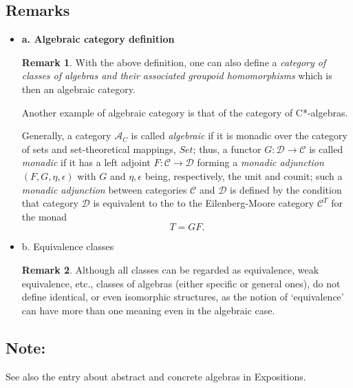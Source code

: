 \documentclass[12pt]{article}
\theoremstyle{plain}
\theoremstyle{definition}
\newtheorem{remark}{Remark}[section]
\numberwithin{equation}{section}
\begin{document}
\subsection{Remarks}
\begin{itemize}
\item {\bf a. Algebraic category definition}

\begin{remark}
 With the above definition, one can also define a \emph{category of classes of algebras and their
associated groupoid homomorphisms} which is then an algebraic category. 
 
 Another example of algebraic category is that of the category of C*-algebras.

 Generally, a category $\mathcal{A}_C$ is called \emph{algebraic} if it is monadic over the category of sets and set-theoretical mappings, $Set$; thus, a functor $G: \mathcal{D} \to \mathcal{C}$ is called \emph{monadic} if it has a left adjoint 
$F: \mathcal{C}\to \mathcal{D}$ forming a {\em monadic adjunction} $(F,G,\eta,\epsilon)$ with $G$ and $\eta, \epsilon$
being, respectively, the unit and counit; such a {\em monadic adjunction} between categories 
$\mathcal{C}$ and $\mathcal{D}$ is defined by the condition that category $\mathcal{D}$ is equivalent to the to the Eilenberg-Moore category $\mathcal{C} ^T$ for the monad 
$$T = GF.$$

\end{remark}



\item b. Equivalence classes
\begin{remark}
 Although all classes can be regarded as equivalence, weak equivalence, etc., classes of 
algebras (either specific or general ones), do not define identical, or even isomorphic structures, as the notion of `equivalence' can have more than one meaning even in the algebraic case.

\end{remark} 
\end{itemize}

\subsection{Note:}
See also the entry about abstract and concrete algebras in Expositions.
\end{document}
